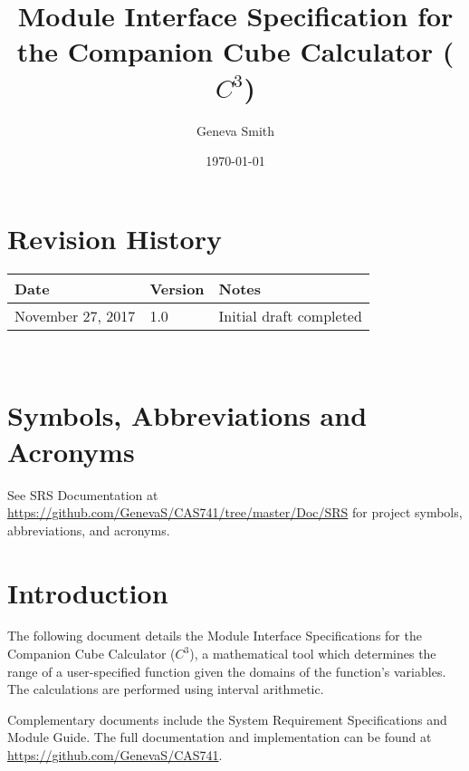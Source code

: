 \documentclass[12pt, titlepage]{article}
\newcommand{\progname}{Companion Cube Calculator}
\newcommand{\prognameAbbrv}{$C^{3}$}
\begin{document}
\title{Module Interface Specification for the \progname{} (\prognameAbbrv{})}

\author{Geneva Smith}

\date{\today}

\maketitle


\section{Revision History}

\begin{tabularx}{\textwidth}{p{3cm}p{2cm}X}
\toprule {\bf Date} & {\bf Version} & {\bf Notes}\\
\midrule
November 27, 2017 & 1.0 & Initial draft completed\\
\bottomrule
\end{tabularx}

~\newpage

\section{Symbols, Abbreviations and Acronyms}

See SRS Documentation at 
\url{https://github.com/GenevaS/CAS741/tree/master/Doc/SRS} for project 
symbols, abbreviations, and acronyms.

\newpage

\tableofcontents

\newpage


\section{Introduction}

The following document details the Module Interface Specifications for the 
\progname{} (\prognameAbbrv{}), a mathematical tool which determines the range 
of a user-specified function given the domains of the function's variables. The 
calculations are performed using interval arithmetic.

Complementary documents include the System Requirement Specifications
and Module Guide.  The full documentation and implementation can be
found at \url{https://github.com/GenevaS/CAS741}.
\end{document}
